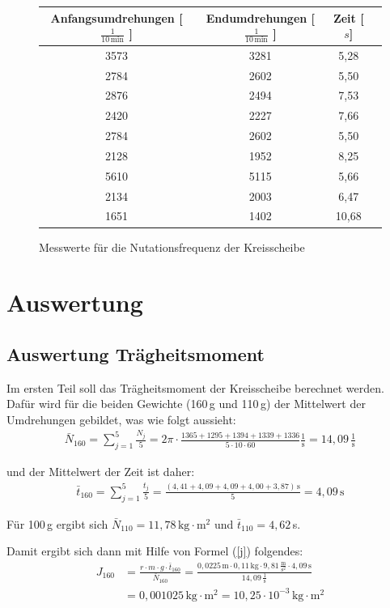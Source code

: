 \documentclass[fontsize=12pt]{scrartcl}
\begin{document}
\begin{figure}[H]
\centering
\caption{Messwerte für die Nutationsfrequenz der Kreisscheibe}
\begin{tabular}{|c|c|c|c|} \hline
Anfangsumdrehungen [$ \frac{1}{10\,\text{min}}$ ]  &  Endumdrehungen [$\frac{1}{10\,\text{min}}$ ]  &  Zeit [$s$] \\ \hline
3573	&3281	&5,28\\ \hline
2784	&2602	&5,50\\ \hline
2876	&2494	&7,53\\ \hline
2420	&2227	&7,66\\ \hline
2784	&2602	&5,50\\ \hline
2128	&1952	&8,25\\ \hline
5610	&5115		&5,66\\ \hline
2134	&2003	&6,47\\ \hline
1651	&1402	&10,68\\ \hline
\end{tabular}				 
\end{figure}

\newpage

\section{ Auswertung}

\subsection{Auswertung Trägheitsmoment}
Im ersten Teil soll das Trägheitsmoment der Kreisscheibe berechnet werden. Dafür wird für die beiden Gewichte (160\,g und 110\,g) der Mittelwert der Umdrehungen gebildet, was wie folgt aussieht:
\begin{align*}
\bar{N}_{160} = \sum_{j=1}^{5} \frac{N_j}{5} = 2 \pi \cdot \frac{1365+1295+1394+1339+1336}{5\cdot 10 \cdot 60 }{\frac{1}{\text{s}}} = 14,09\,{\frac{1}{\text{s}}}
\end{align*}

und der Mittelwert der Zeit ist daher:
\begin{align*}
\bar{t}_{160} = \sum_{j=1}^{5} \frac{t_j}{5} =  \frac{(4,41+4,09+4,09+4,00+3,87)\,{\text{s}}}{5} = 4,09\,{\text{s}}
\end{align*}

Für 100\,g ergibt sich $\bar{N}_{110} = 11,78\,{\text{kg}\cdot{\text{m}^2}}$ und $\bar{t}_{110}=4,62$\,s.

Damit ergibt sich dann mit Hilfe von Formel (\ref{j}) folgendes:
\begin{align*}
J_{160} &=\frac{r \cdot m \cdot g \cdot \bar{t}_{160}}{\bar{N}_{160}} =	\frac{0,0225\,{\text{m}} \cdot 0,11\,{\text{kg}} \cdot 9,81\,\frac{ {\text{m}}}{{\text{s}^2}} \cdot 4,09\,{\text{s}}}{14,09\,{\frac{1}{\text{s}}}} \\&= 0,001025\,{{\text{kg} \cdot {\text{m}^2}}} = 10,25 \cdot 10^{-3}\,{{\text{kg} \cdot {\text{m}^2}}}
\end{align*}
\end{document}
